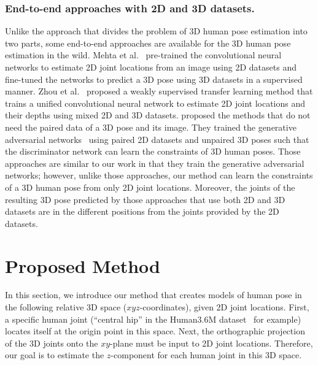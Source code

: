 \documentclass[runningheads]{llncs}
\newcommand{\matsui}[1]{\textbf{\textcolor{cyan}{[\textsc{MATSUI:} #1]}}}
\newcommand{\kudo}[1]{\textbf{\textcolor{blue}{[\textsc{KUDO:} #1]}}}
\begin{document}
\subsubsection{End-to-end approaches with 2D and 3D datasets.}
Unlike the approach that divides the problem of 3D human pose estimation into two parts, some end-to-end approaches are available for the 3D human pose estimation in the wild.
Mehta et al.~\cite{mpi-inf} pre-trained the convolutional neural networks to estimate 2D joint locations from an image using 2D datasets and fine-tuned the networks to predict a 3D pose using 3D datasets in a supervised manner.
Zhou et al.~\cite{zhou2017towards} proposed a weakly supervised transfer learning method that trains a unified convolutional neural network to estimate 2D joint locations and their depths using mixed 2D and 3D datasets. 
\cite{hmrKanazawa17,tung2017adversarial} proposed the methods that do not need the paired data of a 3D pose and its image.
They trained the generative adversarial networks~\cite{goodfellow2014generative} using paired 2D datasets and unpaired 3D poses such that the discriminator network can learn the constraints of 3D human poses.
Those approaches are similar to our work in that they train the generative adversarial networks; however, unlike those approaches, our method can learn the constraints of a 3D human pose from only 2D joint locations.
Moreover, the joints of the resulting 3D pose predicted by those approaches that use both 2D and 3D datasets are in the different positions from the joints provided by the 2D datasets.

\section{Proposed Method}
In this section, we introduce our method that creates models of human pose in the following relative 3D space ($xyz$-coordinates), given 2D joint locations.
First, a specific human joint (``central hip'' in the Human3.6M dataset~\cite{ionescu2014human3.6m} for example) locates itself at the origin point in this space.
Next, the orthographic projection of the 3D joints onto the $xy$-plane must be input to 2D joint locations.
Therefore, our goal is to estimate the $z$-component for each human joint in this 3D space.
\end{document}
